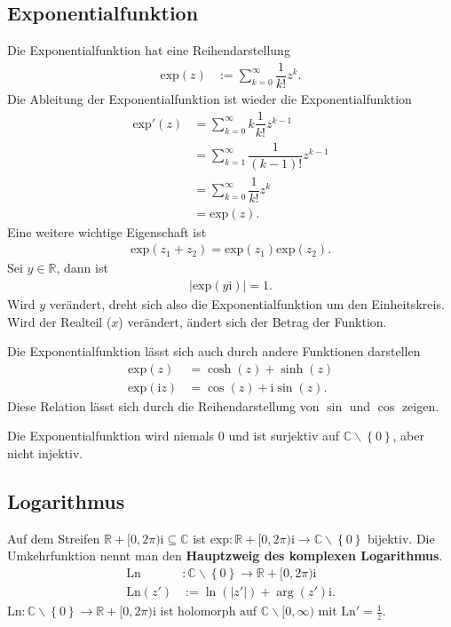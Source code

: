 \documentclass[a4paper,12pt]{article}
\numberwithin{equation}{section}
\begin{document}
\subsection{Exponentialfunktion}
Die Exponentialfunktion hat eine Reihendarstellung
\begin{align} 
        \text{exp}\left(z\right)&:=\sum_{k=0}^{\infty}\dfrac{1}{k!}z^k
.\end{align} 
Die Ableitung der Exponentialfunktion ist wieder die Exponentialfunktion
\begin{align} 
        \text{exp}'\left(z\right)&=\sum_{k=0}^{\infty}k\dfrac{1}{k!}z^{k-1}\\
                                     &=\sum_{k=1}^{\infty}\dfrac{1}{\left(k-1\right)!}z^{k-1}\\
                                     &=\sum_{k=0}^{\infty}\dfrac{1}{k!}z^k\\
                                     &=\text{exp}\left(z\right)
.\end{align} 
Eine weitere wichtige Eigenschaft ist 
\begin{align} 
        \text{exp}\left(z_1+z_2\right)=\text{exp}\left(z_1\right)\text{exp}\left(z_2\right)
.\end{align} 
Sei $y \in \mathbb{R}$, dann ist
\begin{align} 
        |\text{exp}\left(y\text{i}\right)|=1
.\end{align} 
Wird $y$ verändert, dreht sich also die Exponentialfunktion um den Einheitskreis. Wird der Realteil ($x$) verändert, ändert sich der Betrag der Funktion.\par
Die Exponentialfunktion lässt sich auch durch andere Funktionen darstellen
\begin{align} 
        \text{exp}\left(z\right)&=\cosh \left(z\right)+\sinh \left(z\right)\\
        \text{exp}\left(\text{i}z\right)&=\cos \left(z\right)+\text{i}\sin \left(z\right)
.\end{align} 
Diese Relation lässt sich durch die Reihendarstellung von $\sin $ und $\cos $ zeigen.\par
Die Exponentialfunktion wird niemals 0 und ist surjektiv auf $\mathbb{C}\backslash \left\{0\right\}$, aber nicht injektiv.

\subsection{Logarithmus}
Auf dem Streifen $\mathbb{R}+[0,2\pi )\text{i}\subseteq \mathbb{C}$ ist $\text{exp}:\mathbb{R}+[0,2\pi )\text{i}\rightarrow \mathbb{C}\backslash \left\{0\right\}$ bijektiv. Die Umkehrfunktion nennt man den \textbf{Hauptzweig des komplexen Logarithmus}.
\begin{align} 
        \text{Ln}&:\mathbb{C}\backslash \left\{0\right\}\rightarrow \mathbb{R}+[0,2\pi )\text{i}\\
        \text{Ln}\left(z'\right)&:=\ln\left(|z'|\right)+\arg\left(z'\right)\text{i}
.\end{align} 
$\text{Ln}:\mathbb{C}\backslash \left\{0\right\}\rightarrow \mathbb{R}+[0,2\pi )\text{i}$ ist holomorph auf $\mathbb{C}\backslash [0,\infty)$ mit $\text{Ln}'=\tfrac{1}{z}$.
\end{document}
